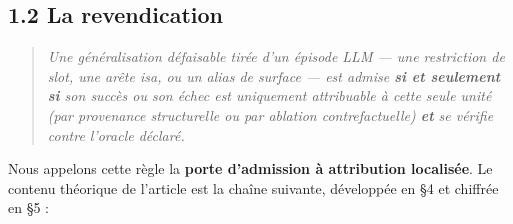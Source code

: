\documentclass[11pt]{article}
\begin{document}
\subsection*{1.2 La revendication}

\begin{quote}\itshape Une généralisation défaisable tirée d'un épisode LLM — une restriction de slot, une arête \emph{isa}, ou un alias de surface — est admise \textbf{si et seulement si} son succès ou son échec est \emph{uniquement attribuable} à cette seule unité (par provenance structurelle ou par ablation contrefactuelle) \textbf{et} se vérifie contre l'oracle déclaré.\end{quote}

Nous appelons cette règle la \textbf{porte d'admission à attribution localisée}. Le contenu théorique de l'article est la chaîne suivante, développée en §4 et chiffrée en §5 :
\end{document}
